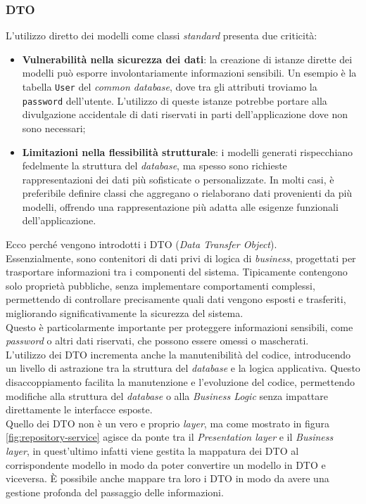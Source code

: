 \subsubsection{DTO}\label{chap:dto}
L'utilizzo diretto dei modelli come classi \textit{standard} presenta due criticità:
\begin{itemize}
    \item \textbf{Vulnerabilità nella sicurezza dei dati}: la creazione di istanze dirette dei modelli può esporre 
          involontariamente informazioni sensibili. Un esempio è la tabella \texttt{User} del \textit{common database}, 
          dove tra gli attributi troviamo la \texttt{password} dell'utente. L'utilizzo di queste 
          istanze potrebbe portare alla divulgazione accidentale di dati riservati in parti dell'applicazione dove 
          non sono necessari;
    \item \textbf{Limitazioni nella flessibilità strutturale}: i modelli generati rispecchiano fedelmente la struttura 
        del \textit{database}, ma spesso sono richieste rappresentazioni dei dati più sofisticate o personalizzate. 
          In molti casi, è preferibile definire classi che aggregano o rielaborano dati provenienti da più modelli, 
          offrendo una rappresentazione più adatta alle esigenze funzionali dell'applicazione.
\end{itemize}
Ecco perché vengono introdotti i DTO (\textit{Data Transfer Object}).\\
Essenzialmente, sono contenitori di dati privi di logica di \textit{business}, progettati per trasportare informazioni tra i 
componenti del sistema. Tipicamente contengono solo proprietà pubbliche, senza implementare comportamenti complessi, 
permettendo di controllare precisamente quali dati vengono esposti e trasferiti, migliorando significativamente la 
sicurezza del sistema.\\
Questo è particolarmente importante per proteggere informazioni sensibili, come \textit{password} o altri dati riservati, 
che possono essere omessi o mascherati.\\
L'utilizzo dei DTO incrementa anche la manutenibilità del codice, introducendo un livello di astrazione tra la 
struttura del \textit{database} e la logica applicativa. Questo disaccoppiamento facilita la manutenzione e 
l'evoluzione del codice, permettendo modifiche alla struttura del \textit{database} o alla \textit{Business Logic} 
senza impattare direttamente le interfacce esposte.\\
Quello dei DTO non è un vero e proprio \textit{layer}, ma come mostrato in figura \ref{fig:repository-service} agisce 
da ponte tra il \textit{Presentation layer} e il \textit{Business layer}, in quest'ultimo infatti viene gestita la 
mappatura dei DTO al corrispondente modello in modo da poter convertire un modello in DTO e viceversa.
È possibile anche mappare tra loro i DTO in modo da avere una gestione profonda del passaggio delle informazioni.